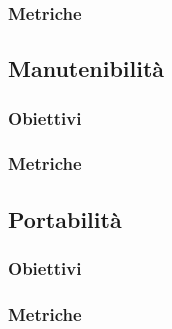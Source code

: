 \subsubsection{Metriche}
\subsection{Manutenibilità}
\subsubsection{Obiettivi}
\subsubsection{Metriche}
\subsection{Portabilità}
\subsubsection{Obiettivi}
\subsubsection{Metriche}
